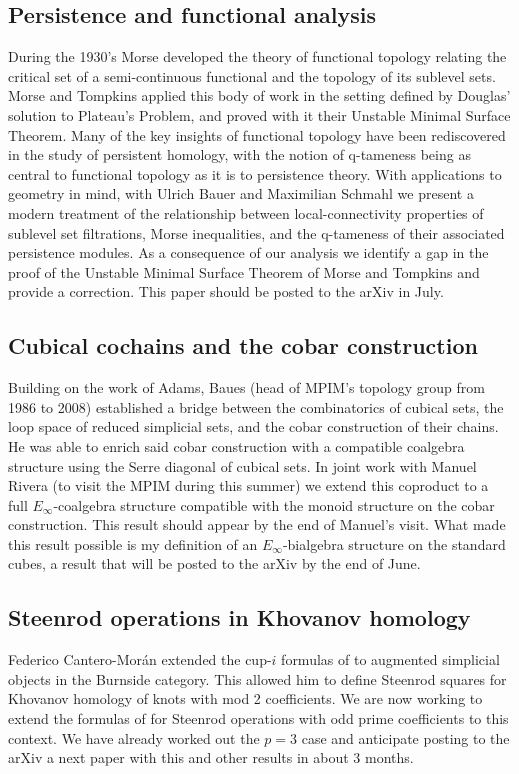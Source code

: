 \documentclass{amsart}
\theoremstyle{definition}
\begin{document}
	\subsection{Persistence and functional analysis}
	During the 1930's Morse developed the theory of functional topology relating the critical set of a semi-continuous functional and the topology of its sublevel sets.
	Morse and Tompkins applied this body of work in the setting defined by Douglas' solution to Plateau's Problem, and proved with it their Unstable Minimal Surface Theorem.
	Many of the key insights of functional topology have been rediscovered in the study of persistent homology, with the notion of q-tameness being as central to functional topology as it is to persistence theory.
	With applications to geometry in mind, with Ulrich Bauer and Maximilian Schmahl we present a modern treatment of the relationship between local-connectivity properties of sublevel set filtrations, Morse inequalities, and the q-tameness of their associated persistence modules.
	As a consequence of our analysis we identify a gap in the proof of the Unstable Minimal Surface Theorem of Morse and Tompkins and provide a correction.
	This paper should be posted to the arXiv in July.
	
	\subsection{Cubical cochains and the cobar construction}
	Building on the work of Adams, Baues (head of MPIM's topology group from 1986 to 2008) established a bridge between the combinatorics of cubical sets, the loop space of reduced simplicial sets, and the cobar construction of their chains.
	He was able to enrich said cobar construction with a compatible coalgebra structure using the Serre diagonal of cubical sets.
	In joint work with Manuel Rivera (to visit the MPIM during this summer) we extend this coproduct to a full $E_\infty$-coalgebra structure compatible with the monoid structure on the cobar construction. This result should appear by the end of Manuel's visit.
	What made this result possible is my definition of an $E_\infty$-bialgebra structure on the standard cubes, a result that will be posted to the arXiv by the end of June.
	
	\subsection{Steenrod operations in Khovanov homology}
	Federico Cantero-Mor\'an extended the cup-$i$ formulas of \cite{medina2021newformulas} to augmented simplicial objects in the Burnside category.
	This allowed him to define Steenrod squares for Khovanov homology of knots with mod 2 coefficients.
	We are now working to extend the formulas of \cite{medina2020odd} for Steenrod operations with odd prime coefficients to this context.
	We have already worked out the $p=3$ case and anticipate posting to the arXiv a next paper with this and other results in about 3 months.
	
\end{document}
